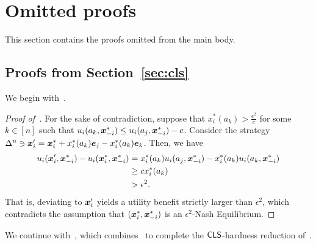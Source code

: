 \section{Omitted proofs}
\label{sec:proofs}

This section contains the proofs omitted from the main body.

\subsection{Proofs from Section~\ref{sec:cls}}
\label{sec:proofs1}

We begin with~.

\begin{proof}[Proof of~]
    For the sake of contradiction, suppose that $x^*_i(a_k) > \frac{\epsilon^2}{c}$ for some $k \in [n]$ such that $u_i(a_k, {\bm{x}}^*_{-i}) \leq u_i(a_j, {\bm{x}}^*_{-i}) - c$. Consider the strategy $\Delta^n \ni {\bm{x}}_i' = {\bm{x}}_i^* + x_i^*(a_k) {\bm{e}}_{j} - x_i^*(a_k) {\bm{e}}_{k}$. Then, we have
    \begin{align*}
        u_i({\bm{x}}_i', {\bm{x}}^*_{-i}) - u_i({\bm{x}}_i^*, {\bm{x}}^*_{-i}) &= x_i^*(a_k) u_i(a_j, {\bm{x}}^*_{-i}) - x_i^*(a_k) u_i(a_k, {\bm{x}}^*_{-i}) \\
        &\geq c x_i^*(a_k) \\
        &> \epsilon^2.
    \end{align*}
    That is, deviating to ${\bm{x}}_i'$ yields a utility benefit strictly larger than $\epsilon^2$, which contradicts the assumption that $({\bm{x}}_i^*, {\bm{x}}^*_{-i})$ is an $\epsilon^2$-Nash Equilibrium.
\end{proof}

We continue with~, which combines~ to complete the $\mathsf{CLS}$-hardness reduction of~.

\teamadvtosymme*

